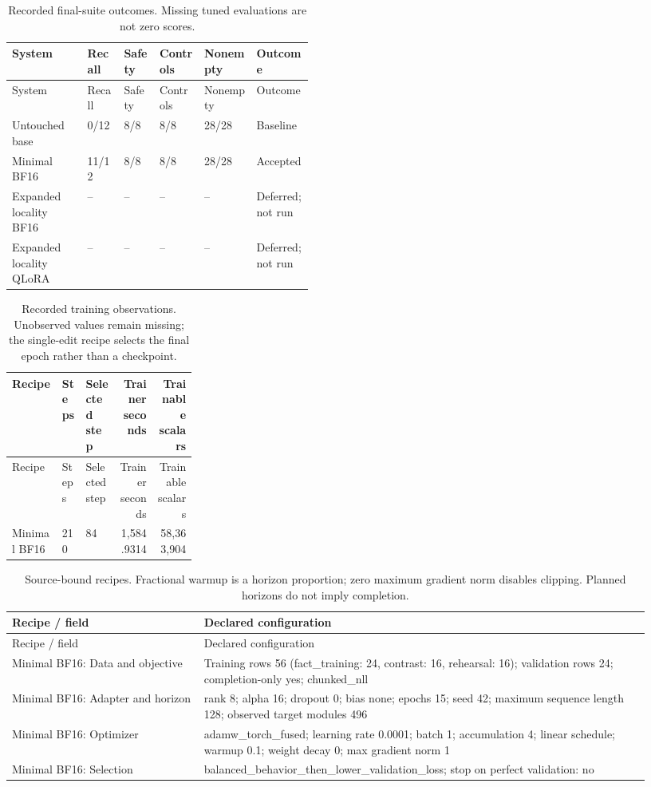 \begingroup\small
\begin{longtable}{p{0.25\linewidth}llllp{0.19\linewidth}}
\caption{Recorded final-suite outcomes. Missing tuned evaluations are not zero scores.}\label{tab:generated-scores}\\
\toprule
System & Recall & Safety & Controls & Nonempty & Outcome \\
\midrule\endfirsthead
\toprule
System & Recall & Safety & Controls & Nonempty & Outcome \\
\midrule\endhead
Untouched base & 0/12 & 8/8 & 8/8 & 28/28 & Baseline \\
Minimal BF16 & 11/12 & 8/8 & 8/8 & 28/28 & Accepted \\
Expanded locality BF16 & -- & -- & -- & -- & Deferred; not run \\
Expanded locality QLoRA & -- & -- & -- & -- & Deferred; not run \\
\bottomrule\end{longtable}\endgroup

\begingroup\small
\begin{longtable}{p{0.27\linewidth}llrr}
\caption{Recorded training observations. Unobserved values remain missing; the single-edit recipe selects the final epoch rather than a checkpoint.}\label{tab:generated-training}\\
\toprule
Recipe & Steps & Selected step & Trainer seconds & Trainable scalars \\
\midrule\endfirsthead
\toprule
Recipe & Steps & Selected step & Trainer seconds & Trainable scalars \\
\midrule\endhead
Minimal BF16 & 210 & 84 & 1,584.9314 & 58,363,904 \\
\bottomrule\end{longtable}\endgroup

\begingroup\small
\begin{longtable}{p{0.28\linewidth}p{0.65\linewidth}}
\caption{Source-bound recipes. Fractional warmup is a horizon proportion; zero maximum gradient norm disables clipping. Planned horizons do not imply completion.}\label{tab:generated-recipes}\\
\toprule
Recipe / field & Declared configuration \\
\midrule\endfirsthead
\toprule
Recipe / field & Declared configuration \\
\midrule\endhead
Minimal BF16: Data and objective & Training rows 56 (fact\_training: 24, contrast: 16, rehearsal: 16); validation rows 24; completion-only yes; chunked\_nll \\
Minimal BF16: Adapter and horizon & rank 8; alpha 16; dropout 0; bias none; epochs 15; seed 42; maximum sequence length 128; observed target modules 496 \\
Minimal BF16: Optimizer & adamw\_torch\_fused; learning rate 0.0001; batch 1; accumulation 4; linear schedule; warmup 0.1; weight decay 0; max gradient norm 1 \\
Minimal BF16: Selection & balanced\_behavior\_then\_lower\_validation\_loss; stop on perfect validation: no \\
\bottomrule\end{longtable}\endgroup

